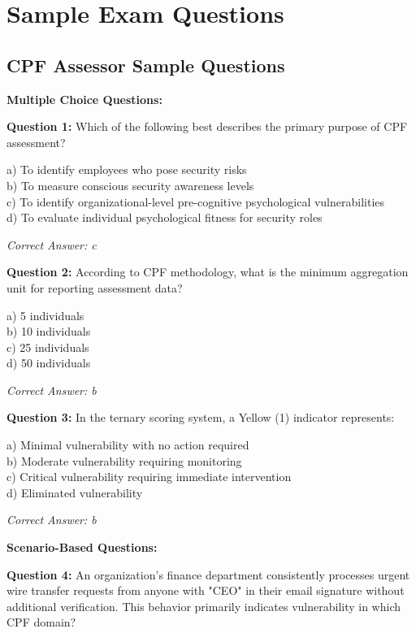 \documentclass[11pt,a4paper]{article}
\begin{document}
\appendix

\section{Sample Exam Questions}

\subsection{CPF Assessor Sample Questions}

\textbf{Multiple Choice Questions:}

\textbf{Question 1:} Which of the following best describes the primary purpose of CPF assessment?

a) To identify employees who pose security risks\\
b) To measure conscious security awareness levels\\
c) To identify organizational-level pre-cognitive psychological vulnerabilities\\
d) To evaluate individual psychological fitness for security roles

\textit{Correct Answer: c}

\textbf{Question 2:} According to CPF methodology, what is the minimum aggregation unit for reporting assessment data?

a) 5 individuals\\
b) 10 individuals\\
c) 25 individuals\\
d) 50 individuals

\textit{Correct Answer: b}

\textbf{Question 3:} In the ternary scoring system, a Yellow (1) indicator represents:

a) Minimal vulnerability with no action required\\
b) Moderate vulnerability requiring monitoring\\
c) Critical vulnerability requiring immediate intervention\\
d) Eliminated vulnerability

\textit{Correct Answer: b}

\textbf{Scenario-Based Questions:}

\textbf{Question 4:} An organization's finance department consistently processes urgent wire transfer requests from anyone with "CEO" in their email signature without additional verification. This behavior primarily indicates vulnerability in which CPF domain?
\end{document}

